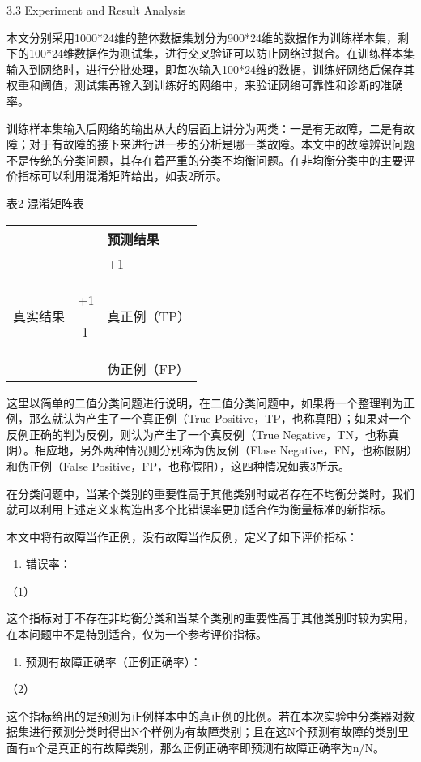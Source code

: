 3.3 Experiment and Result Analysis

本文分别采用1000*24维的整体数据集划分为900*24维的数据作为训练样本集，剩下的100*24维数据作为测试集，进行交叉验证可以防止网络过拟合。在训练样本集输入到网络时，进行分批处理，即每次输入100*24维的数据，训练好网络后保存其权重和阈值，测试集再输入到训练好的网络中，来验证网络可靠性和诊断的准确率。

训练样本集输入后网络的输出从大的层面上讲分为两类：一是有无故障，二是有故障；对于有故障的接下来进行进一步的分析是哪一类故障。本文中的故障辨识问题不是传统的分类问题，其存在着严重的分类不均衡问题。在非均衡分类中的主要评价指标可以利用混淆矩阵给出，如表2所示。

表2 混淆矩阵表

\begin{longtable}[c]{@{}lll@{}}
\toprule
& & 预测结果\tabularnewline
\midrule
\endhead
& & +1\tabularnewline
真实结果 & +1

-1 & 真正例（TP）\tabularnewline
& & 伪正例（FP）\tabularnewline
\bottomrule
\end{longtable}

这里以简单的二值分类问题进行说明，在二值分类问题中，如果将一个整理判为正例，那么就认为产生了一个真正例（True
Positive，TP，也称真阳）；如果对一个反例正确的判为反例，则认为产生了一个真反例（True
Negative，TN，也称真阴）。相应地，另外两种情况则分别称为伪反例（Flase
Negative，FN，也称假阴）和伪正例（False
Positive，FP，也称假阳），这四种情况如表3所示。

在分类问题中，当某个类别的重要性高于其他类别时或者存在不均衡分类时，我们就可以利用上述定义来构造出多个比错误率更加适合作为衡量标准的新指标。

本文中将有故障当作正例，没有故障当作反例，定义了如下评价指标：

\begin{enumerate}
\def\labelenumi{\arabic{enumi}.}
\item
  错误率：
\end{enumerate}

（1）

这个指标对于不存在非均衡分类和当某个类别的重要性高于其他类别时较为实用，在本问题中不是特别适合，仅为一个参考评价指标。

\begin{enumerate}
\def\labelenumi{\arabic{enumi}.}
\item
  预测有故障正确率（正例正确率）：
\end{enumerate}

（2）

这个指标给出的是预测为正例样本中的真正例的比例。若在本次实验中分类器对数据集进行预测分类时得出N个样例为有故障类别；且在这N个预测有故障的类别里面有n个是真正的有故障类别，那么正例正确率即预测有故障正确率为n/N。

